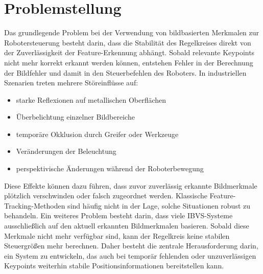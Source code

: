 \section{Problemstellung}
\label{sec:Problemstellung}
Das grundlegende Problem bei der Verwendung von bildbasierten Merkmalen zur Robotersteuerung besteht darin, dass die Stabilität des Regelkreises direkt von der Zuverlässigkeit der Feature-Erkennung abhängt. Sobald relevante Keypoints nicht mehr korrekt erkannt werden können, entstehen Fehler in der Berechnung der Bildfehler und damit in den Steuerbefehlen des Roboters.
In industriellen Szenarien treten mehrere Störeinflüsse auf:
\begin{itemize}
	\item starke Reflexionen auf metallischen Oberflächen
	\item Überbelichtung einzelner Bildbereiche
	\item temporäre Okklusion durch Greifer oder Werkzeuge
	\item Veränderungen der Beleuchtung
	\item perspektivische Änderungen während der Roboterbewegung
\end{itemize}

Diese Effekte können dazu führen, dass zuvor zuverlässig erkannte Bildmerkmale plötzlich verschwinden oder falsch zugeordnet werden. Klassische Feature-Tracking-Methoden sind häufig nicht in der Lage, solche Situationen robust zu behandeln.
Ein weiteres Problem besteht darin, dass viele \ac{IBVS}-Systeme ausschließlich auf den aktuell erkannten Bildmerkmalen basieren. Sobald diese Merkmale nicht mehr verfügbar sind, kann der Regelkreis keine stabilen Steuergrößen mehr berechnen.
Daher besteht die zentrale Herausforderung darin, ein System zu entwickeln, das auch bei temporär fehlenden oder unzuverlässigen Keypoints weiterhin stabile Positionsinformationen bereitstellen kann.

